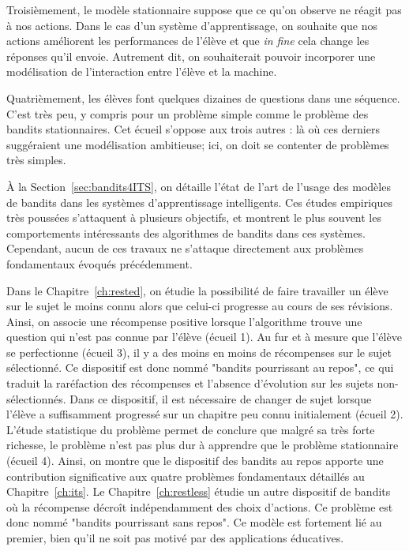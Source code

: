 Troisièmement, le modèle stationnaire suppose que ce qu'on observe ne réagit pas à nos actions. Dans le cas d'un système d'apprentissage, on souhaite que nos actions améliorent les performances de l'élève et que \emph{in fine} cela change les réponses qu'il envoie. Autrement dit, on souhaiterait pouvoir incorporer une modélisation de l'interaction entre l'élève et la machine.

Quatrièmement, les élèves font quelques dizaines de questions dans une séquence. C'est très peu, y compris pour un problème simple comme le problème des bandits stationnaires. Cet écueil s'oppose aux trois autres : là où ces derniers suggéraient une modélisation ambitieuse; ici, on doit se contenter de problèmes très simples.

À la Section~\ref{sec:bandits4ITS}, on détaille l'état de l'art de l'usage des modèles de bandits dans les systèmes d'apprentissage intelligents. Ces études empiriques très poussées s'attaquent à plusieurs objectifs, et montrent le plus souvent les comportements intéressants des algorithmes de bandits dans ces systèmes. Cependant, aucun de ces travaux ne s'attaque directement aux problèmes fondamentaux évoqués précédemment.

Dans le Chapitre~\ref{ch:rested}, on étudie la possibilité de faire travailler un élève sur le sujet le moins connu alors que celui-ci progresse au cours de ses révisions. Ainsi, on associe une récompense positive lorsque l'algorithme trouve une question qui n'est pas connue par l'élève (écueil 1). Au fur et à mesure que l'élève se perfectionne (écueil 3), il y a des moins en moins de récompenses sur le sujet sélectionné. Ce dispositif est donc nommé "bandits pourrissant au repos", ce qui traduit la raréfaction des récompenses et l'absence d'évolution sur les sujets non-sélectionnés. Dans ce dispositif, il est nécessaire de changer de sujet lorsque l'élève a suffisamment progressé sur un chapitre peu connu initialement (écueil 2). L'étude statistique du problème permet de conclure que malgré sa très forte richesse, le problème n'est pas plus dur à apprendre que le problème stationnaire (écueil 4). Ainsi, on montre que le dispositif des bandits au repos apporte une contribution significative aux quatre problèmes fondamentaux détaillés au Chapitre~\ref{ch:its}. Le Chapitre~\ref{ch:restless} étudie un autre dispositif de bandits où la récompense décroît indépendamment des choix d'actions. Ce problème est donc nommé "bandits pourrissant sans repos". Ce modèle est fortement lié au premier, bien qu'il ne soit pas motivé par des applications éducatives. 

